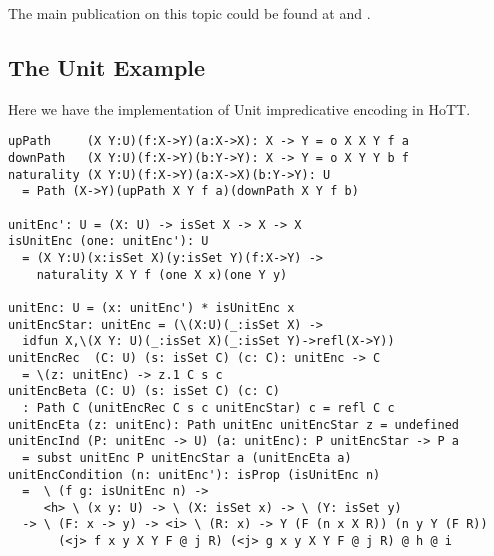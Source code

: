 \documentclass{article}
\theoremstyle{definition}
\begin{document}
The main publication on this topic could be found at \cite{Awodey17} and \cite{Speight17}.

\subsection{The Unit Example}

Here we have the implementation of Unit impredicative encoding in HoTT.

\begin{lstlisting}[mathescape=true]
upPath     (X Y:U)(f:X->Y)(a:X->X): X -> Y = o X X Y f a
downPath   (X Y:U)(f:X->Y)(b:Y->Y): X -> Y = o X Y Y b f
naturality (X Y:U)(f:X->Y)(a:X->X)(b:Y->Y): U
  = Path (X->Y)(upPath X Y f a)(downPath X Y f b)

unitEnc': U = (X: U) -> isSet X -> X -> X
isUnitEnc (one: unitEnc'): U
  = (X Y:U)(x:isSet X)(y:isSet Y)(f:X->Y) ->
    naturality X Y f (one X x)(one Y y)

unitEnc: U = (x: unitEnc') * isUnitEnc x
unitEncStar: unitEnc = (\(X:U)(_:isSet X) ->
  idfun X,\(X Y: U)(_:isSet X)(_:isSet Y)->refl(X->Y))
unitEncRec  (C: U) (s: isSet C) (c: C): unitEnc -> C
  = \(z: unitEnc) -> z.1 C s c
unitEncBeta (C: U) (s: isSet C) (c: C)
  : Path C (unitEncRec C s c unitEncStar) c = refl C c
unitEncEta (z: unitEnc): Path unitEnc unitEncStar z = undefined
unitEncInd (P: unitEnc -> U) (a: unitEnc): P unitEncStar -> P a
  = subst unitEnc P unitEncStar a (unitEncEta a)
unitEncCondition (n: unitEnc'): isProp (isUnitEnc n)
  =  \ (f g: isUnitEnc n) ->
     <h> \ (x y: U) -> \ (X: isSet x) -> \ (Y: isSet y)
  -> \ (F: x -> y) -> <i> \ (R: x) -> Y (F (n x X R)) (n y Y (F R))
       (<j> f x y X Y F @ j R) (<j> g x y X Y F @ j R) @ h @ i
\end{lstlisting}



\end{document}
